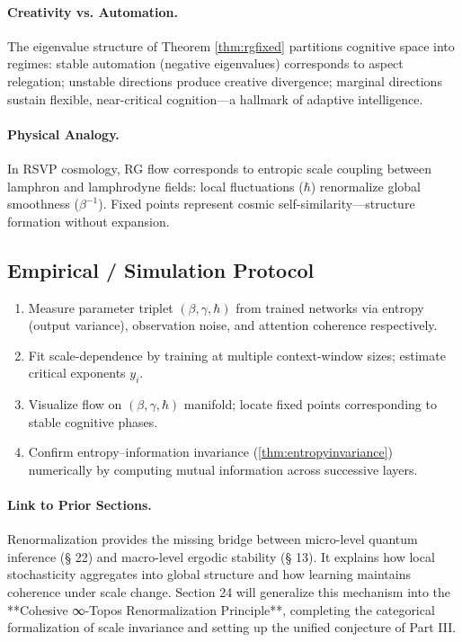 \documentclass[12pt,a4paper,twoside,openright]{book}
\begin{document}
\paragraph{Creativity vs. Automation.}
The eigenvalue structure of Theorem \ref{thm:rgfixed} partitions cognitive space into regimes:  
stable automation (negative eigenvalues) corresponds to aspect relegation;  
unstable directions produce creative divergence;  
marginal directions sustain flexible, near-critical cognition—a hallmark of adaptive intelligence.

\paragraph{Physical Analogy.}
In RSVP cosmology, RG flow corresponds to entropic scale coupling between lamphron and lamphrodyne fields:  
local fluctuations (\(\hbar\)) renormalize global smoothness (\(\beta^{-1}\)).  
Fixed points represent cosmic self-similarity—structure formation without expansion.

\subsection*{Empirical / Simulation Protocol}

\begin{enumerate}
\item Measure parameter triplet $(\beta,\gamma,\hbar)$ from trained networks via entropy (output variance), observation noise, and attention coherence respectively.
\item Fit scale-dependence by training at multiple context-window sizes; estimate critical exponents $y_i$.
\item Visualize flow on $(\beta,\gamma,\hbar)$ manifold; locate fixed points corresponding to stable cognitive phases.
\item Confirm entropy–information invariance (\ref{thm:entropyinvariance}) numerically by computing mutual information across successive layers.
\end{enumerate}

\paragraph{Link to Prior Sections.}
Renormalization provides the missing bridge between micro-level quantum inference (§ 22) and macro-level ergodic stability (§ 13).  
It explains how local stochasticity aggregates into global structure and how learning maintains coherence under scale change.  
Section 24 will generalize this mechanism into the **Cohesive ∞-Topos Renormalization Principle**, completing the categorical formalization of scale invariance and setting up the unified conjecture of Part III.
\end{document}
